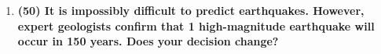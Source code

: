 \documentclass[11pt,a4paper]{article}
\begin{document}
\begin{enumerate}[leftmargin=*,topsep=0pt,font=\bfseries]
        \newpage
    \item\textbf{(50) It is impossibly difficult to predict earthquakes. However, expert geologists confirm that 1 high-magnitude earthquake will occur in 150 years. Does your decision change?}
        \vspace{\baselineskip}


        
        
        
        
        
        
        
        
        
        
        
        
        
        
        
        
        
        
        
        
        
        
        
        
        
        
        
        
        
        
        
        
        
        
        
        
        
        






\end{enumerate}

\newpage 


\setlength{\bibhang}{0pt}

\end{document}
